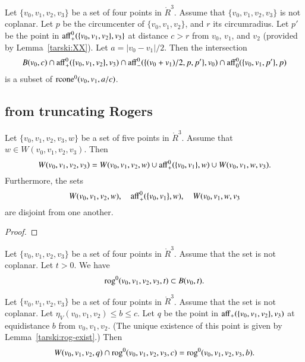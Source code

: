 \newpage

\begin{lemma}
Let $\{v_0,v_1,v_2,v_3\}$ be a set of four points in $\ring{R}^3$.
Assume that $\{v_0,v_1,v_2,v_3\}$ is not coplanar.  Let $p$
be the circumcenter of $\{v_0,v_1,v_2\}$, and $r$ its circumradius.  
Let $p'$ be the
point in ${\operatorname{aff}}_+^0(\{v_0,v_1,v_2\},v_3\}$ at distance
$c > r$ from $v_0$, $v_1$, and $v_2$ (provided by Lemma~\ref{tarski:XX}).
Let $a = |v_0-v_1|/2$.
Then the intersection
  $$
  B(v_0,c)\cap
  {\operatorname{aff}}^0_+(\{v_0,v_1,v_2\},v_3) \cap
  {\operatorname{aff}}^0_-(\{(v_0+v_1)/2,p,p' \},v_0) \cap
  {\operatorname{aff}}^0_0(\{v_0,v_1,p'\},p)
  $$
is a subset of ${\operatorname{rcone}}^0(v_0,v_1,a/c)$.
\end{lemma}

\newpage

\subsection{from truncating Rogers}

\begin{lemma}
Let $\{v_0,v_1,v_2,v_3,w\}$ be a set of five points in $\ring{R}^3$.
Assume that $w\in W(v_0,v_1,v_2,v_3)$. Then
$$
W(v_0,v_1,v_2,v_3) = W(v_0,v_1,v_2,w) \cup {\operatorname{aff}}_+^0(\{v_0,v_1\},w)
\cup W(v_0,v_1,w,v_3).
$$
Furthermore, the sets
$$
W(v_0,v_1,v_2,w),\quad {\operatorname{aff}}_+^0(\{v_0,v_1\},w),\quad
W(v_0,v_1,w,v_3
$$
are disjoint from one another.
\end{lemma}

\begin{proof}
\end{proof}

\newpage

\begin{lemma}
Let $\{v_0,v_1,v_2,v_3\}$ be a set of four points in $\ring{R}^3$.
Assume that the set is not coplanar.
Let $t>0$.  We have
$$
   {\operatorname{rog}}^0(v_0,v_1,v_2,v_3,t) \subset B(v_0,t).
$$
\end{lemma}

\newpage

\begin{lemma}
Let $\{v_0,v_1,v_2,v_3\}$ be a set of four points in $\ring{R}^3$.
Assume that the set is not coplanar.
Let $\eta_V(v_0,v_1,v_2) \le b \le c$.  Let $q$ be the point
in ${\operatorname{aff}}_+(\{v_0,v_1,v_2\},v_3)$ at equidistance $b$
from $v_0,v_1,v_2$.  (The unique existence of this point is given
by Lemma~\ref{tarski:rog-exist}.)  Then
$$
W(v_0,v_1,v_2,q) \cap {\operatorname{rog}}^0(v_0,v_1,v_2,v_3,c) = 
  {\operatorname{rog}}^0(v_0,v_1,v_2,v_3,b).
$$
\end{lemma}

